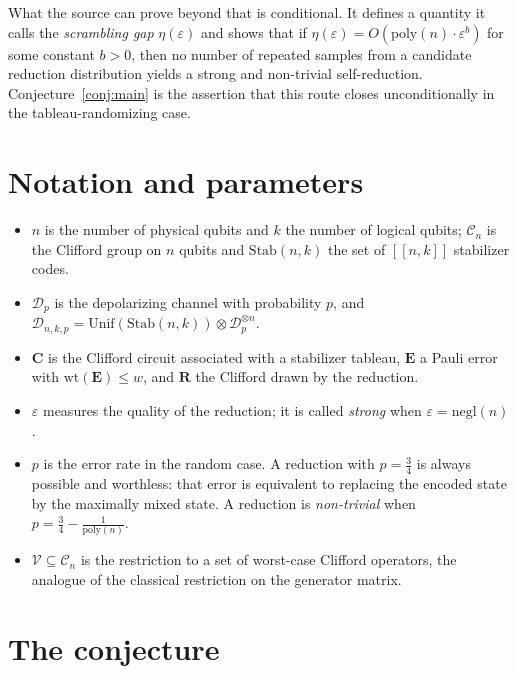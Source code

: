 \documentclass{aicr-conjecture}
\newcommand{\eps}{\varepsilon}
\newcommand{\Cliff}{\mathcal{C}}
\begin{document}
What the source can prove beyond that is conditional. It defines a
quantity it calls the \emph{scrambling gap} $\eta(\eps)$ and shows that
if $\eta(\eps) = O(\mathrm{poly}(n)\cdot\eps^{b})$ for some constant $b >
0$, then no number of repeated samples from a candidate reduction
distribution yields a strong and non-trivial self-reduction.
Conjecture~\ref{conj:main} is the assertion that this route closes
unconditionally in the tableau-randomizing case.

\section{Notation and parameters}\label{sec:notation}

\begin{itemize}[nosep]
  \item $n$ is the number of physical qubits and $k$ the number of
    logical qubits; $\Cliff_{n}$ is the Clifford group on $n$ qubits and
    $\mathrm{Stab}(n,k)$ the set of $[\![n,k]\!]$ stabilizer codes.
  \item $\mathcal{D}_{p}$ is the depolarizing channel with probability
    $p$, and $\mathcal{D}_{n,k,p} = \mathrm{Unif}(\mathrm{Stab}(n,k))
    \otimes \mathcal{D}_{p}^{\otimes n}$.
  \item $\mathbf{C}$ is the Clifford circuit associated with a stabilizer
    tableau, $\mathbf{E}$ a Pauli error with $\mathrm{wt}(\mathbf{E}) \le
    w$, and $\mathbf{R}$ the Clifford drawn by the reduction.
  \item $\eps$ measures the quality of the reduction; it is called
    \emph{strong} when $\eps = \mathrm{negl}(n)$.
  \item $p$ is the error rate in the random case. A reduction with $p =
    \frac{3}{4}$ is always possible and worthless: that error is
    equivalent to replacing the encoded state by the maximally mixed
    state. A reduction is \emph{non-trivial} when $p = \frac{3}{4} -
    \frac{1}{\mathrm{poly}(n)}$.
  \item $\mathcal{V} \subseteq \Cliff_{n}$ is the restriction to a set of
    worst-case Clifford operators, the analogue of the classical
    restriction on the generator matrix.
\end{itemize}

\section{The conjecture}\label{sec:conjectures}
\end{document}
